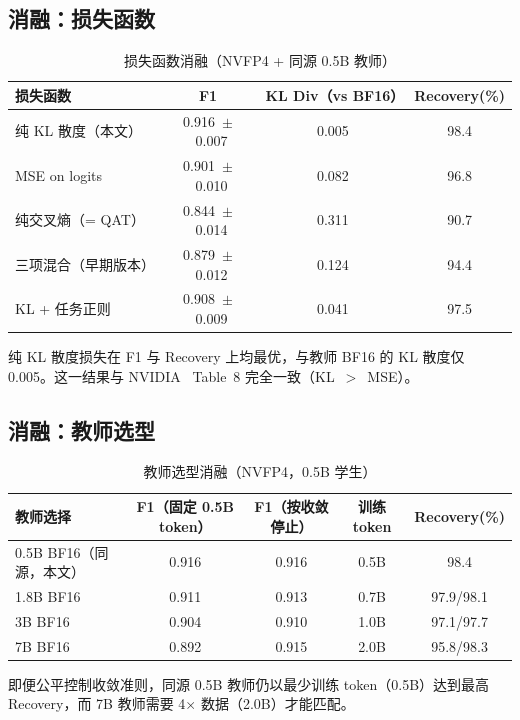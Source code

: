 \documentclass[UTF8,a4paper,10pt,twocolumn]{ctexart}
\theoremstyle{plain}
\begin{document}
\subsection{消融：损失函数}

\begin{table}[H]
\centering
\caption{损失函数消融（NVFP4 + 同源 0.5B 教师）}
\label{tab:loss_ablation}
\small
\begin{tabular}{lccc}
\toprule
损失函数 & F1 & KL Div（vs BF16） & Recovery(\%) \\
\midrule
纯 KL 散度（本文） & 0.916~$\pm$~0.007 & 0.005 & 98.4 \\
MSE on logits & 0.901~$\pm$~0.010 & 0.082 & 96.8 \\
纯交叉熵（= QAT） & 0.844~$\pm$~0.014 & 0.311 & 90.7 \\
三项混合（早期版本） & 0.879~$\pm$~0.012 & 0.124 & 94.4 \\
KL + 任务正则 & 0.908~$\pm$~0.009 & 0.041 & 97.5 \\
\bottomrule
\end{tabular}
\end{table}

纯 KL 散度损失在 F1 与 Recovery 上均最优，与教师 BF16 的 KL 散度仅 0.005。这一结果与 NVIDIA~\cite{xin2026qad} Table~8 完全一致（KL~$>$~MSE）。

\subsection{消融：教师选型}

\begin{table}[H]
\centering
\caption{教师选型消融（NVFP4，0.5B 学生）}
\label{tab:teacher_ablation}
\small
\begin{tabular}{lcccc}
\toprule
教师选择 & F1（固定 0.5B token） & F1（按收敛停止） & 训练 token & Recovery(\%) \\
\midrule
0.5B BF16（同源，本文） & 0.916 & 0.916 & 0.5B & 98.4 \\
1.8B BF16 & 0.911 & 0.913 & 0.7B & 97.9/98.1 \\
3B BF16 & 0.904 & 0.910 & 1.0B & 97.1/97.7 \\
7B BF16 & 0.892 & 0.915 & 2.0B & 95.8/98.3 \\
\bottomrule
\end{tabular}
\end{table}

即便公平控制收敛准则，同源 0.5B 教师仍以最少训练 token（0.5B）达到最高 Recovery，而 7B 教师需要 4$\times$ 数据（2.0B）才能匹配。
\end{document}
